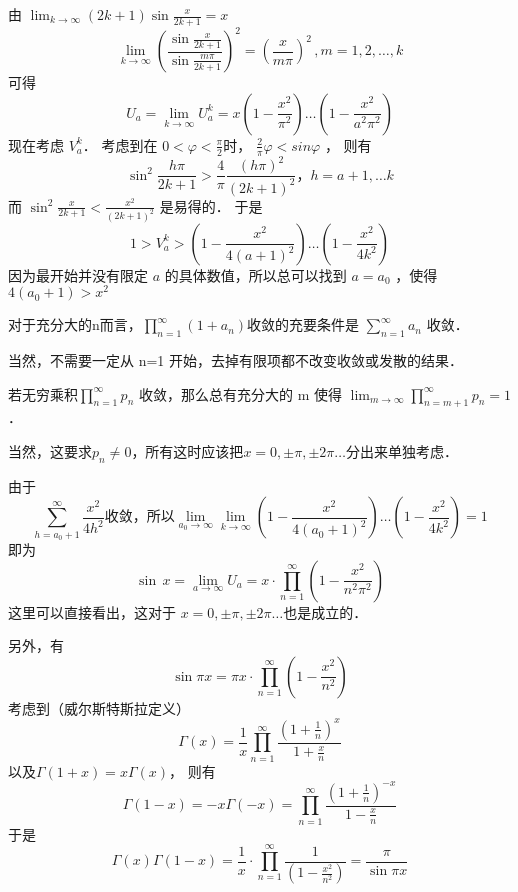 由  $\lim_{k\rightarrow\infty}(2k+1)\sin\frac{x}{2k+1}=x$
\begin{equation}
\lim_{k\rightarrow\infty}\left( \frac{\sin\frac{x}{2k+1}}{\sin\frac{m\pi}{2k+1}} \right)^2=\left( \frac{x}{m\pi} \right)^2\,,m=1,2,\dots,k
\end{equation}
可得
\begin{equation}
U_a=\lim_{k\rightarrow\infty}U^k_a=x(1-\frac{x^2}{\pi^2})\dots(1-\frac{x^2}{a^2\pi^2})
\end{equation}
现在考虑 $V^k_a$． 考虑到在 $0<\varphi<\frac\pi2 $时， $\frac2\pi\varphi<sin\varphi$ ，
则有
\begin{equation}
\sin^2\frac {h\pi}{2k+1}>\frac4\pi\frac{(h\pi)^2}{(2k+1)^2}，h=a+1,\dots k 
\end{equation}
而 $\sin^2\frac x{2k+1}<\frac{x^2}{(2k+1)^2}$ 是易得的． 于是
\begin{equation}
1>V^k_a>(1-\frac{x^2}{4(a+1)^2})\dots(1-\frac{x^2}{4k^2})
\end{equation}
因为最开始并没有限定 $a$ 的具体数值，所以总可以找到 $a=a_0$ ，使得 $4(a_0+1)>x^2$
\begin{lemma}{}
对于充分大的n而言，$\prod_{n=1}^{\infty}(1+a_n) $收敛的充要条件是  $\sum_{n=1}^{\infty}{a_n}$ 收敛．
\end{lemma}
当然，不需要一定从 n=1 开始，去掉有限项都不改变收敛或发散的结果．
\begin{lemma}{}
若无穷乘积$\prod_{n=1}^{\infty}p_n$ 收敛，那么总有充分大的 m 使得 $\lim_{m\rightarrow\infty}\prod_{n=m+1}^{\infty}p_n=1$．
\end{lemma}
当然，这要求$ p_n\ne0 $，所有这时应该把$ x=0,\pm\pi,\pm 2\pi\dots $分出来单独考虑．

由于
\begin{equation}
\sum_{h=a_0+1}^{\infty}{\frac{x^2}{4h^2}} 收敛，所以 \lim_{a_0\rightarrow\infty}\lim_{k\rightarrow\infty}(1-\frac{x^2}{4(a_0+1)^2})\dots(1-\frac{x^2}{4k^2})=1
\end{equation}
即为
\begin{equation}
\sin\,x=\lim_{a\rightarrow\infty}U_a=x\cdot \prod_{n=1}^{\infty}(1-\frac{x^2}{n^2\pi^2})
\end{equation}
这里可以直接看出，这对于 $x=0,\pm\pi,\pm 2\pi\dots $也是成立的．

另外，有
\begin{equation}
\sin\pi x=\pi x\cdot \prod_{n=1}^{\infty}(1-\frac{x^2}{n^2})
\end{equation}
考虑到（威尔斯特斯拉定义）
\begin{equation}
\Gamma(x)=\frac1x\prod_{n=1}^{\infty}\frac{(1+\frac1n)^{x}}{1+\frac xn}
\end{equation}
以及$ \Gamma(1+x)=x\Gamma(x)$， 则有
\begin{equation}
\Gamma(1-x)=-x\Gamma(-x)=\prod_{n=1}^{\infty}\frac{(1+\frac1n)^{-x}}{1-\frac xn}
\end{equation}
于是
\begin{equation}
\Gamma(x)\Gamma(1-x)=\frac{1}{x}\cdot \prod_{n=1}^{\infty}\frac1{(1-\frac{x^2}{n^2})}=\frac\pi{\sin\pi x}
\end{equation}
